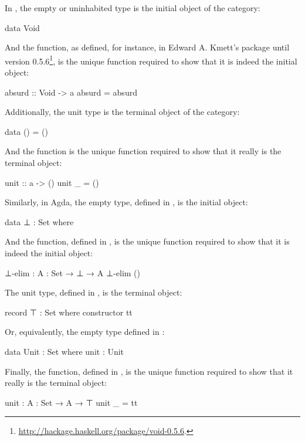 \begin{example}

  \label{ex:initial-terminal-objects-haskell}

  In \hask, the empty or uninhabited type is the initial object of the
  category:
  \begin{codehaskell}
data Void
  \end{codehaskell}
  And the  function, as defined, for instance, in
  Edward A. Kmett's  package until version
  0.5.6\footnote{\url{http://hackage.haskell.org/package/void-0.5.6}.},
  is the unique function required to show that it is indeed the
  initial object:
  \begin{codehaskell}
absurd :: Void -> a
absurd = absurd
  \end{codehaskell}

  Additionally, the unit type is the terminal object of the category:
  \begin{codehaskell}
data () = ()
  \end{codehaskell}
  And the  function is the unique function required
  to show that it really is the terminal object:
  \begin{codehaskell}
unit :: a -> ()
unit _ = ()
  \end{codehaskell}

\end{example}

\begin{example}

  \label{ex:initial-terminal-objects-agda}

  Similarly, in Agda, the empty type, defined in ,
  is the initial object:
  \begin{codeagda}
data ⊥ : Set where
  \end{codeagda}
  And the  function, defined in
  , is the unique function required to show
  that it is indeed the initial object:
  \begin{codeagda}
⊥-elim : {A : Set} → ⊥ → A
⊥-elim ()
  \end{codeagda}

  The unit type, defined in , is the terminal
  object:
  \begin{codeagda}
record ⊤ : Set where
  constructor tt
  \end{codeagda}
  Or, equivalently, the empty type defined in :
  \begin{codeagda}
data Unit : Set where
  unit : Unit
  \end{codeagda}
  Finally, the  function, defined in
  , is the unique function required to show
  that it really is the terminal object:
  \begin{codeagda}
unit : {A : Set} → A → ⊤
unit _ = tt
  \end{codeagda}

\end{example}

